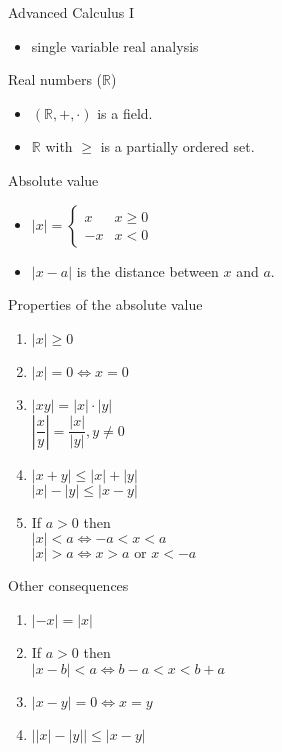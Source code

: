 \documentclass{article}
\newcommand{\reals}{\mathbb{R}}
\begin{document}
Advanced Calculus I
\begin{itemize}
	\item
		single variable real analysis
\end{itemize}

Real numbers ($\reals$)
\begin{itemize}
	\item
		$(\reals, +, \cdot)$ is a field.
	\item
		$\reals$ with $\geq$ is a partially ordered set.
\end{itemize}

Absolute value
\begin{itemize}
	\item
		$|x| = \begin{cases}
			x & x \geq 0 \\
			-x & x < 0 
		\end{cases}$
	\item
		$|x - a|$ is the distance between $x$ and $a$.
\end{itemize}

Properties of the absolute value
\begin{enumerate}
	\item
		$|x| \geq 0$
	\item
		$|x| = 0 \Leftrightarrow x = 0$
	\item
		$|xy| = |x| \cdot |y|$ \\
		$\left|\dfrac{x}{y}\right| = \dfrac{|x|}{|y|}, y \neq 0$
	\item
		$|x + y| \leq |x| + |y|$ \\
		$|x| - |y| \leq |x - y|$
	\item
		If $a > 0$ then \\
		$|x| < a \Leftrightarrow -a < x < a$ \\
		$|x| > a \Leftrightarrow x > a \text{ or } x < -a$
\end{enumerate}

Other consequences
\begin{enumerate}
	\item
		$|-x| = |x|$
	\item
		If $a > 0$ then \\
		$|x - b| < a \Leftrightarrow b - a < x < b + a$
	\item
		$|x - y| = 0 \Leftrightarrow x = y$
	\item
		$\bigl||x| - |y|\bigr| \leq |x - y|$
\end{enumerate}
\end{document}
